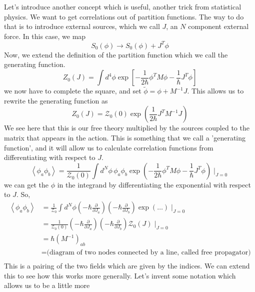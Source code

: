 \documentclass[11pt, oneside]{article}   	%
\theoremstyle{slanted}
\begin{document}
Let's introduce another 
concept which is useful, 
another trick from statistical physics. 
We want to get correlations out of partition functions. 
The way to do that is to introduce external sources, 
which we call $ J $, an $ N $ component external 
force. 
In this case, we map 
\[
S _ 0 \left( \phi  \right)  \to S_ 0 \left( \phi  \right)  + J ^ T \phi 
\] Now, 
we extend the definition of the partition function 
which we call the generating function. 
\[
Z_ 0 \left( J  \right)   = \int d ^ 4 \phi \exp 
\left[   - \frac{1}{2 \hbar } \phi ^ T M \phi  - \frac{1}{\hbar} J ^ T \phi  \right] 
\] we now have to complete the square, 
and set $ \tilde{ \phi }  = \phi + M ^{  -1 } J  $. 
This allows us to rewrite the generating function as 
\[
Z _ 0 \left( J  \right)   = \mathcal{ Z } _ 0 \left( 0  \right)  
\exp \left( \frac{1}{2 \hbar } J ^ T M ^{ - 1} J  \right) 
\] We see here that this is 
our free theory multiplied by the 
sources coupled to the matrix that 
appears in the action. 
This is something that we call a 'generating function', and it will allow us to calculate correlation 
functions from differentiating with respect to $ J $. 
\[
\left< \phi _ a \phi _ b  \right>  = \frac{1}{\mathcal{ Z } _ 0 \left( 0  \right)  } 
\int d ^ N \phi \, \phi _ a \phi _ b \exp 
\left(  - \frac{1}{2 \hbar} \phi ^ T M \phi  - \frac{1}{\hbar }
J ^ T \phi \right) \mid_{ J = 0 }
\] we can get the $ \phi $ in the integrand by 
differentiating the exponential with respect to $ J $. 
So, 
\begin{align*}
\left< \phi _ a \phi _ b  \right> &=  \frac{1}{\mathcal{ Z } _ 0 } 
\int d ^ N \phi \left(   - \hbar \frac{\partial  }{\partial  J _ a }   \right)  
\left(  - \hbar \frac{\partial  }{\partial  J_ b }   \right)  \exp \left( 
\dots \right)  \mid_{ J = 0 } \\
			   &=  \frac{1}{ \mathcal{ Z } _ 0 \left( 0  \right)  } 
			   \left(  - \hbar \frac{\partial  }{\partial J_ a }  \right)
			   \left(  - \hbar \frac{\partial  }{\partial  J _ b }   \right)  \mathcal{ Z } _ 0 \left( J  \right)  \mid _{ J = 0 } \\
			   &=  \hbar \left( M ^{ - 1 }  \right) _{ ab }  \\
			   &=  \text{(diagram of two nodes 
			   connected by a line, called free propagator)} \\
\end{align*}
This is a pairing of the two fields
which are given by the indices. 
We can extend this 
to see how this works more generally. 
Let's invent some notation 
which allows us to be a little more 
\end{document}
